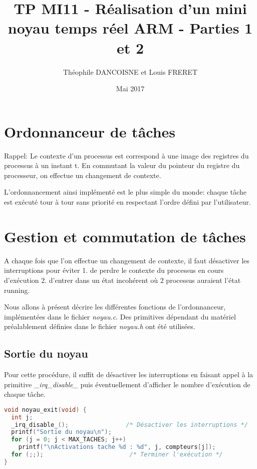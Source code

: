 \documentclass{article}
\title{TP MI11 - Réalisation d’un mini noyau temps réel ARM - Parties 1 et 2}
\author{Théophile DANCOISNE et Louis FRERET}
\date{Mai 2017}
\begin{document}
\maketitle

\section{Ordonnanceur de tâches}
Rappel: Le contexte d'un processus est correspond à une image des registres du processus à un instant t. En commutant la valeur du pointeur du registre du processeur, on effectue un changement de contexte.


L'ordonnancement ainsi implémenté est le plus simple du monde: chaque tâche est exécuté tour à tour sans priorité en respectant l'ordre défini par l'utilisateur.



\section{Gestion et commutation de tâches}
A chaque fois que l'on effectue un changement de contexte, il faut désactiver les interruptions pour éviter 1. de perdre le contexte du processus en cours d'exécution 2. d'entrer dans un état incohérent où 2 processus auraient l'état running.

Nous allons à présent décrire les différentes fonctions de l'ordonnanceur, implémentées dans le fichier \textit{noyau.c}. Des primitives dépendant du matériel préalablement définies dans le fichier \textit{noyau.h} ont été utilisées.

\subsection{Sortie du noyau}
Pour cette procédure, il suffit de désactiver les interruptions en faisant appel à la primitive \textit{\_irq\_disable\_} puis éventuellement d'afficher le nombre d'exécution de chaque tâche.
\begin{lstlisting}[language=C, caption=noyau.c]
void noyau_exit(void) {
  int j;
  _irq_disable_();                /* Désactiver les interruptions */
  printf("Sortie du noyau\n");
  for (j = 0; j < MAX_TACHES; j++)
    printf("\nActivations tache %d : %d", j, compteurs[j]);
  for (;;);                        /* Terminer l'exécution */
}
\end{lstlisting}
\end{document}
